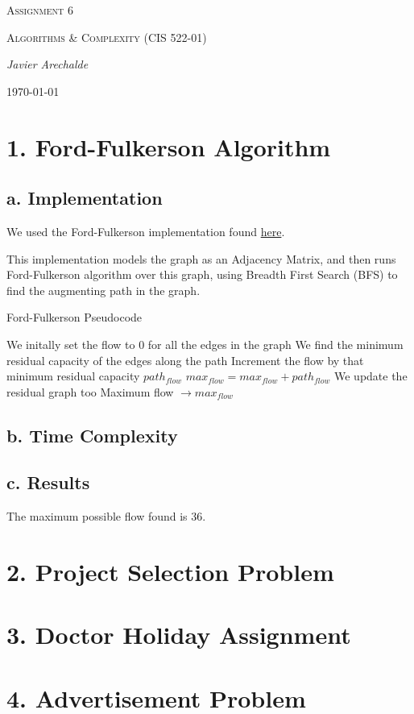 \documentclass{article}
\begin{document}
\begin{titlepage}
	\centering
	{\scshape\LARGE Assignment 6\par}
	\vspace{1cm}
	{\scshape\Large Algorithms \& Complexity (CIS 522-01)\par}
	\vspace{1.5cm}
	{\Large\itshape Javier Arechalde\par}
	\vfill
	{\large \today\par}
\end{titlepage}

\section*{1. Ford-Fulkerson Algorithm}

\subsection*{a. Implementation}

We used the Ford-Fulkerson implementation found \href{https://www.geeksforgeeks.org/ford-fulkerson-algorithm-for-maximum-flow-problem/}{here}.

This implementation models the graph as an Adjacency Matrix, and then runs Ford-Fulkerson algorithm over this graph, using Breadth First Search (BFS) to find the augmenting path in the graph.

\begin{algorithm}[H]
\caption{Ford-Fulkerson Pseudocode}
\begin{algorithmic}[1]
 \State We initally set the flow to 0 for all the edges in the graph
  \State We find the minimum residual capacity of the edges along the path
  \State Increment the flow by that minimum residual capacity $path_{flow}$
  \State $max_{flow} = max_{flow} + path_{flow}$
  \State We update the residual graph too
 \EndWhile
 \State \Return Maximum flow $\rightarrow max_{flow}$
\EndFunction
\end{algorithmic}
\end{algorithm}

\subsection*{b. Time Complexity}

\subsection*{c. Results}

The maximum possible flow found is 36.

\section*{2. Project Selection Problem}

\section*{3. Doctor Holiday Assignment}

\section*{4. Advertisement Problem}
\end{document}
